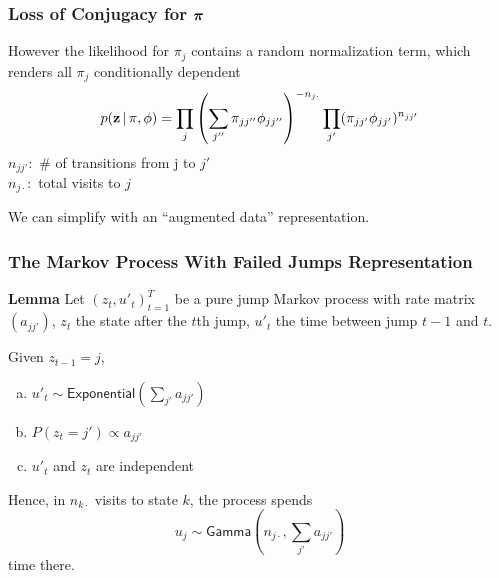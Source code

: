 \documentclass[11pt, mathserif, handout, table]{beamer}
\begin{document}
\begin{frame}
  \frametitle{Loss of Conjugacy for $\boldsymbol{\pi}$}
  However the likelihood for $\pi_j$ contains a random normalization term, which
  renders all $\pi_j$ conditionally dependent
  \begin{equation}
    \label{eq:17}
    p(\mathbf{z} \, \vert \, \pi, \phi) = \prod_{j} \left(\sum_{j''}
      \pi_{jj''}\phi_{jj''}\right)^{-n_{j\cdot}} \prod_{j'} (\pi_{jj'}\phi_{jj'})^{n_{jj'}}
  \end{equation}
  $n_{jj'}:$ \# of transitions from j to $j'$ \\
  $n_{j\cdot}:$ total visits to $j$
  \pause
\vspace{0.2in}

  We can simplify with an ``augmented data'' representation.
\end{frame}
\begin{frame}
  \frametitle{The Markov Process With Failed Jumps Representation}
\begin{exampleblock}{\small
    {\bf Lemma}
    Let $(z_t, u'_{t})_{t=1}^T$ be a pure jump Markov process with 
    rate matrix $(a_{jj'})$, $z_t$ the state after the $t$th jump,
    $u'_t$ the time between jump $t-1$ and $t$.  
    
\vspace{0.2in}
    Given $z_{t-1} = j$,
    \begin{enumerate}[(a)]
    \item $u'_{t} \sim \mathsf{Exponential}(\sum_{j'} a_{jj'})$
    \item $P(z_{t} = j') \propto a_{jj'}$
    \item $u'_{t}$ and $z_{t}$ are independent
    \end{enumerate}
  }
  \end{exampleblock}

  Hence, in $n_{k\cdot}$ visits to state $k$, the process spends
  \begin{equation}
    \label{eq:18}
    u_j \sim \mathsf{Gamma}(n_{j\cdot},\sum_{j'}a_{jj'})
  \end{equation}
  time there.
\end{frame}
\end{document}

